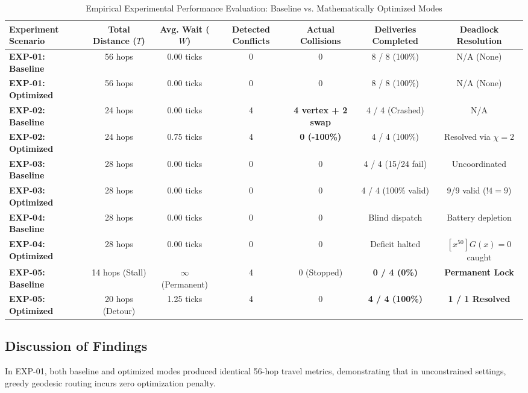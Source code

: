 \documentclass[conference]{IEEEtran}
\begin{document}
\begin{table}[htbp]
\caption{Empirical Experimental Performance Evaluation: Baseline vs. Mathematically Optimized Modes}
\label{tab:results}
\begin{center}
\begin{tabular}{lcccccc}
\toprule
\textbf{Experiment Scenario} & \textbf{Total Distance ($T$)} & \textbf{Avg. Wait ($W$)} & \textbf{Detected Conflicts} & \textbf{Actual Collisions} & \textbf{Deliveries Completed} & \textbf{Deadlock Resolution} \\
\midrule
\textbf{EXP-01: Baseline} & 56 hops & 0.00 ticks & 0 & 0 & 8 / 8 (100\%) & N/A (None) \\
\textbf{EXP-01: Optimized} & 56 hops & 0.00 ticks & 0 & 0 & 8 / 8 (100\%) & N/A (None) \\
\midrule
\textbf{EXP-02: Baseline} & 24 hops & 0.00 ticks & 4 & \textbf{4 vertex + 2 swap} & 4 / 4 (Crashed) & N/A \\
\textbf{EXP-02: Optimized} & 24 hops & 0.75 ticks & 4 & \textbf{0 (-100\%)} & 4 / 4 (100\%) & Resolved via $\chi=2$ \\
\midrule
\textbf{EXP-03: Baseline} & 28 hops & 0.00 ticks & 0 & 0 & 4 / 4 (15/24 fail) & Uncoordinated \\
\textbf{EXP-03: Optimized} & 28 hops & 0.00 ticks & 0 & 0 & 4 / 4 (100\% valid) & 9/9 valid ($!4=9$) \\
\midrule
\textbf{EXP-04: Baseline} & 28 hops & 0.00 ticks & 0 & 0 & Blind dispatch & Battery depletion \\
\textbf{EXP-04: Optimized} & 28 hops & 0.00 ticks & 0 & 0 & Deficit halted & $[x^{50}]G(x)=0$ caught \\
\midrule
\textbf{EXP-05: Baseline} & 14 hops (Stall) & $\infty$ (Permanent) & 4 & 0 (Stopped) & \textbf{0 / 4 (0\%)} & \textbf{Permanent Lock} \\
\textbf{EXP-05: Optimized} & 20 hops (Detour) & 1.25 ticks & 4 & 0 & \textbf{4 / 4 (100\%)} & \textbf{1 / 1 Resolved} \\
\bottomrule
\end{tabular}
\end{center}
\end{table}

\subsection{Discussion of Findings}
In EXP-01, both baseline and optimized modes produced identical 56-hop travel metrics, demonstrating that in unconstrained settings, greedy geodesic routing incurs zero optimization penalty.
\end{document}
